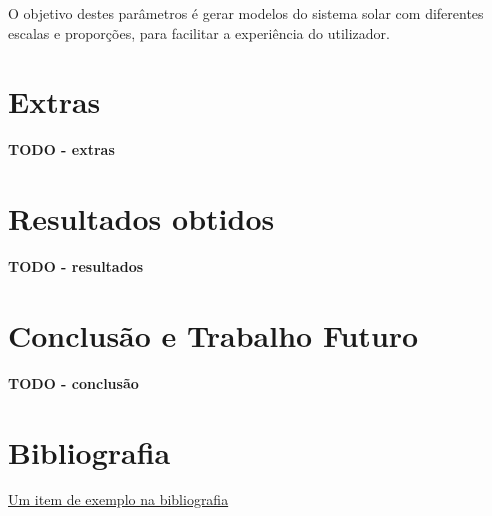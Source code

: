 \documentclass[12pt, a4paper]{article}
\begin{document}
O objetivo destes parâmetros é gerar modelos do sistema solar com diferentes escalas e
proporções, para facilitar a experiência do utilizador.

\section{Extras}

\textbf{\color{red} TODO - extras}

\section{Resultados obtidos}

\textbf{\color{red} TODO - resultados}

\section{Conclusão e Trabalho Futuro}

\textbf{\color{red} TODO - conclusão}

\begingroup
\section{Bibliografia}
\renewcommand{\section}[2]{}

\begin{thebibliography}{9}
        \href{https://youtu.be/dQw4w9WgXcQ}{Um item de exemplo na bibliografia}
\end{thebibliography}
\endgroup
\end{document}
